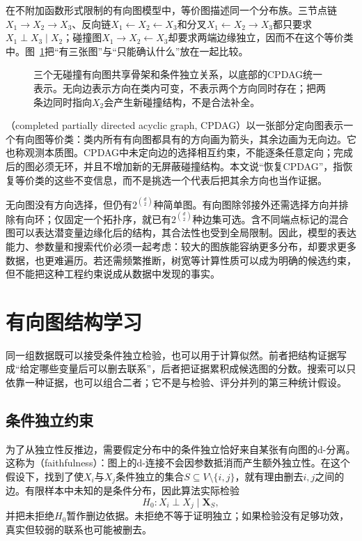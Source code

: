 在不附加函数形式限制的有向图模型中，等价图描述同一个分布族。三节点链$X_1\to X_2\to X_3$、反向链$X_1\leftarrow X_2\leftarrow X_3$和分叉$X_1\leftarrow X_2\to X_3$都只要求$X_1\perp X_3\mid X_2$；碰撞图$X_1\to X_2\leftarrow X_3$却要求两端边缘独立，因而不在这个等价类中。图~\ref{fig:pgm-structure-learning-equivalence}把“有三张图”与“只能确认什么”放在一起比较。

\begin{figure}[htbp]
  \centering
  
  \caption{三个无碰撞有向图共享骨架和条件独立关系，以底部的CPDAG统一表示。无向边表示方向在类内可变，不表示两个方向同时存在；把两条边同时指向$X_2$会产生新碰撞结构，不是合法补全。}
  \label{fig:pgm-structure-learning-equivalence}
\end{figure}

（completed partially directed acyclic graph, CPDAG）以一张部分定向图表示一个有向图等价类：类内所有有向图都具有的方向画为箭头，其余边画为无向边。它也称观测本质图。CPDAG中未定向边的选择相互约束，不能逐条任意定向；完成后的图必须无环，并且不增加新的无屏蔽碰撞结构。本文说“恢复CPDAG”，指恢复等价类的这些不变信息，而不是挑选一个代表后把其余方向也当作证据。

无向图没有方向选择，但仍有$2^{\binom d2}$种简单图。有向图除邻接外还需选择方向并排除有向环；仅固定一个拓扑序，就已有$2^{\binom d2}$种边集可选。含不同端点标记的混合图可以表达潜变量边缘化后的结构，其合法性也受到全局限制。因此，模型的表达能力、参数量和搜索代价必须一起考虑：较大的图族能容纳更多分布，却要求更多数据，也更难遍历。若还需频繁推断，树宽等计算性质可以成为明确的候选约束，但不能把这种工程约束说成从数据中发现的事实。

\section{有向图结构学习}
\label{sec:pgm-structure-learning-directed}

同一组数据既可以接受条件独立检验，也可以用于计算似然。前者把结构证据写成“给定哪些变量后可以删去联系”，后者把证据累积成候选图的分数。搜索可以只依靠一种证据，也可以组合二者；它不是与检验、评分并列的第三种统计假设。

\subsection{条件独立约束}
\label{sec:pgm-structure-learning-constraints}

为了从独立性反推边，需要假定分布中的条件独立恰好来自某张有向图的d-分离。这称为（faithfulness）：图上的d-连接不会因参数抵消而产生额外独立性。在这个假设下，找到了使$X_i$与$X_j$条件独立的集合$S\subseteq V\setminus\{i,j\}$，就有理由删去$i,j$之间的边。有限样本中未知的是条件分布，因此算法实际检验
\[
  H_0:X_i\perp X_j\mid\bm{X}_S,
\]
并把未拒绝$H_0$暂作删边依据。未拒绝不等于证明独立；如果检验没有足够功效，真实但较弱的联系也可能被删去。


